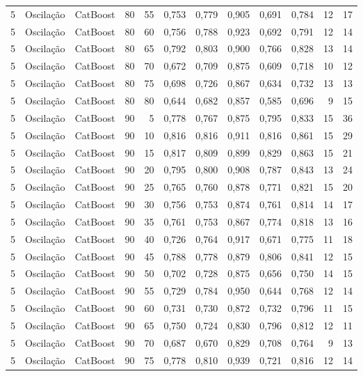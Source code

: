 \begin{longtable}{ccclrrrrrrrr}
5 & Oscilação & CatBoost & 80 & 55 & 0,753 & 0,779 & 0,905 & 0,691 & 0,784 & 12 & 17 \\
5 & Oscilação & CatBoost & 80 & 60 & 0,756 & 0,788 & 0,923 & 0,692 & 0,791 & 12 & 14 \\
5 & Oscilação & CatBoost & 80 & 65 & 0,792 & 0,803 & 0,900 & 0,766 & 0,828 & 13 & 14 \\
5 & Oscilação & CatBoost & 80 & 70 & 0,672 & 0,709 & 0,875 & 0,609 & 0,718 & 10 & 12 \\
5 & Oscilação & CatBoost & 80 & 75 & 0,698 & 0,726 & 0,867 & 0,634 & 0,732 & 13 & 13 \\
5 & Oscilação & CatBoost & 80 & 80 & 0,644 & 0,682 & 0,857 & 0,585 & 0,696 & 9 & 15 \\
5 & Oscilação & CatBoost & 90 & 5 & 0,778 & 0,767 & 0,875 & 0,795 & 0,833 & 15 & 36 \\
5 & Oscilação & CatBoost & 90 & 10 & 0,816 & 0,816 & 0,911 & 0,816 & 0,861 & 15 & 29 \\
5 & Oscilação & CatBoost & 90 & 15 & 0,817 & 0,809 & 0,899 & 0,829 & 0,863 & 15 & 21 \\
5 & Oscilação & CatBoost & 90 & 20 & 0,795 & 0,800 & 0,908 & 0,787 & 0,843 & 13 & 24 \\
5 & Oscilação & CatBoost & 90 & 25 & 0,765 & 0,760 & 0,878 & 0,771 & 0,821 & 15 & 20 \\
5 & Oscilação & CatBoost & 90 & 30 & 0,756 & 0,753 & 0,874 & 0,761 & 0,814 & 14 & 17 \\
5 & Oscilação & CatBoost & 90 & 35 & 0,761 & 0,753 & 0,867 & 0,774 & 0,818 & 13 & 16 \\
5 & Oscilação & CatBoost & 90 & 40 & 0,726 & 0,764 & 0,917 & 0,671 & 0,775 & 11 & 18 \\
5 & Oscilação & CatBoost & 90 & 45 & 0,788 & 0,778 & 0,879 & 0,806 & 0,841 & 12 & 15 \\
5 & Oscilação & CatBoost & 90 & 50 & 0,702 & 0,728 & 0,875 & 0,656 & 0,750 & 14 & 15 \\
5 & Oscilação & CatBoost & 90 & 55 & 0,729 & 0,784 & 0,950 & 0,644 & 0,768 & 12 & 14 \\
5 & Oscilação & CatBoost & 90 & 60 & 0,731 & 0,730 & 0,872 & 0,732 & 0,796 & 11 & 15 \\
5 & Oscilação & CatBoost & 90 & 65 & 0,750 & 0,724 & 0,830 & 0,796 & 0,812 & 12 & 11 \\
5 & Oscilação & CatBoost & 90 & 70 & 0,687 & 0,670 & 0,829 & 0,708 & 0,764 & 9 & 13 \\
5 & Oscilação & CatBoost & 90 & 75 & 0,778 & 0,810 & 0,939 & 0,721 & 0,816 & 12 & 14 \\

\end{longtable}
